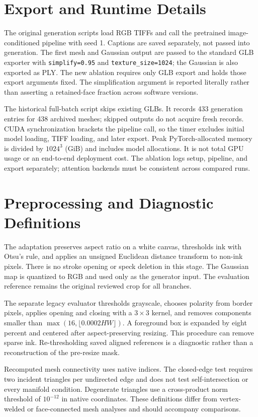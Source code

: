 \appendix
\section{Export and Runtime Details}
\label{app:export}

The original generation scripts load RGB TIFFs and call the pretrained
image-conditioned pipeline with seed 1. Captions are saved separately, not passed
into generation. The first mesh and Gaussian output are passed to the standard
GLB exporter with \texttt{simplify=0.95} and \texttt{texture\_size=1024}; the
Gaussian is also exported as PLY. The new ablation requires only GLB export and
holds those export arguments fixed. The simplification argument is reported
literally rather than asserting a retained-face fraction across software versions.

The historical full-batch script skips existing GLBs. It records 433 generation
entries for 438 archived meshes; skipped outputs do not acquire fresh records.
CUDA synchronization brackets the pipeline call, so the timer excludes initial
model loading, TIFF loading, and later export. Peak PyTorch-allocated memory is
divided by $1024^3$ (GiB) and includes model allocations. It is not total GPU usage
or an end-to-end deployment cost. The ablation logs setup, pipeline, and export
separately; attention backends must be consistent across compared runs.

\section{Preprocessing and Diagnostic Definitions}
The adaptation preserves aspect ratio on a white canvas, thresholds ink with
Otsu's rule, and applies an unsigned Euclidean distance transform to non-ink
pixels. There is no stroke opening or speck deletion in this stage. The Gaussian
map is quantized to RGB and used only as the generator input. The evaluation
reference remains the original reviewed crop for all branches.

The separate legacy evaluator thresholds grayscale, chooses polarity from border
pixels, applies opening and closing with a $3\times3$ kernel, and removes
components smaller than $\max(16,\lfloor0.0002HW\rfloor)$. A foreground box is
expanded by eight percent and centered after aspect-preserving resizing. This
procedure can remove sparse ink. Re-thresholding saved aligned references is a
diagnostic rather than a reconstruction of the pre-resize mask.

Recomputed mesh connectivity uses native indices. The closed-edge test requires
two incident triangles per undirected edge and does not test self-intersection
or every manifold condition. Degenerate triangles use a cross-product norm
threshold of $10^{-12}$ in native coordinates. These definitions differ from
vertex-welded or face-connected mesh analyses and should accompany comparisons.

